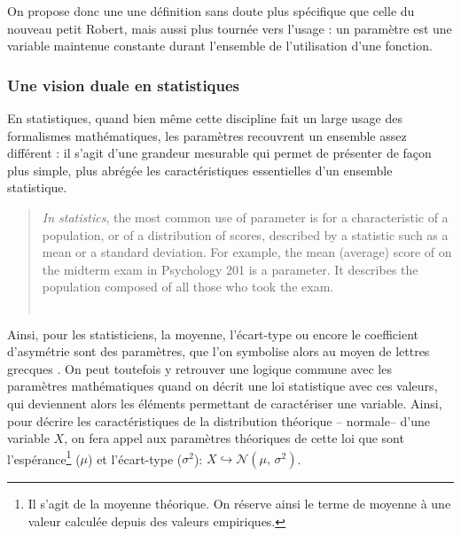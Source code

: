 
On propose donc une une définition sans doute plus spécifique que celle du nouveau petit Robert, mais aussi plus tournée vers l'usage : un paramètre est une variable maintenue constante durant l'ensemble de l'utilisation d'une fonction.

\subsubsection{Une vision duale en statistiques}
En statistiques, quand bien même cette discipline fait un large usage des formalismes mathématiques, les paramètres recouvrent un ensemble assez différent : il s'agit d'une \og grandeur mesurable qui permet de présenter de façon plus simple, plus abrégée les caractéristiques essentielles d'un ensemble statistique.\fg{} \autocite[Paramètre, \textsc{stat.} (calcul des probabilités)]{tresor1992}
\begin{quote}
	\textit{In statistics}, the most common use of \og parameter\fg{} is for a characteristic of a population, or of a distribution of scores, described by a statistic such as a mean or a standard deviation. For example, the mean (average) score of on the midterm exam in Psychology 201 is a parameter. It describes the population composed of all those who took the exam.\\
	\mbox{}~ \hfill \autocite[164]{vogt1993dictionary}
\end{quote}
Ainsi, pour les statisticiens, la moyenne, l'écart-type ou encore le coefficient d'asymétrie sont des paramètres, que l'on symbolise alors au moyen de lettres grecques \autocite[ibid.]{vogt1993dictionary}.
On peut toutefois y retrouver une logique commune avec les paramètres mathématiques quand on décrit une loi statistique avec ces valeurs, qui deviennent alors les éléments permettant de caractériser une variable. Ainsi, pour décrire les caractéristiques de la distribution théorique -- normale-- d'une variable $X$, on fera appel aux paramètres théoriques de cette loi que sont l'espérance\footnote{Il s'agit de la moyenne théorique. On réserve ainsi le terme de moyenne à une valeur calculée depuis des valeurs empiriques.} ($\mu$) et l'écart-type ($\sigma^{2}$): $X \hookrightarrow  \mathcal{N}(\mu,\,\sigma^{2})$.

